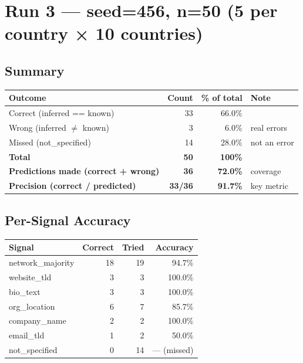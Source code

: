 \documentclass[11pt,a4paper]{article}
\begin{document}
\section{Run 3 — seed=456, n=50 (5 per country × 10 countries)}

\subsection*{Summary}

\begin{tabular}{lrrl}
\toprule
\textbf{Outcome} & \textbf{Count} & \textbf{\% of total} & \textbf{Note} \\
\midrule
Correct (inferred == known) & 33 & 66.0\% & \\
Wrong   (inferred $\neq$ known) &  3 &  6.0\% & real errors \\
Missed  (not\_specified)    & 14 & 28.0\% & not an error \\
\midrule
\textbf{Total} & \textbf{50} & \textbf{100\%} & \\
\midrule
\textbf{Predictions made (correct + wrong)} & \textbf{36} & \textbf{72.0\%} & coverage \\
\textbf{Precision (correct / predicted)}    & \textbf{33/36} & \textbf{91.7\%} & key metric \\
\bottomrule
\end{tabular}

\vspace{8pt}

\subsection*{Per-Signal Accuracy}

\begin{tabular}{lrrr}
\toprule
\textbf{Signal} & \textbf{Correct} & \textbf{Tried} & \textbf{Accuracy} \\
\midrule
network\_majority  & 18 & 19 &  94.7\% \\
website\_tld       &  3 &  3 & 100.0\% \\
bio\_text          &  3 &  3 & 100.0\% \\
org\_location      &  6 &  7 &  85.7\% \\
company\_name      &  2 &  2 & 100.0\% \\
email\_tld         &  1 &  2 &  50.0\% \\
\midrule
not\_specified     &  0 & 14 & — (missed) \\
\bottomrule
\end{tabular}
\end{document}

